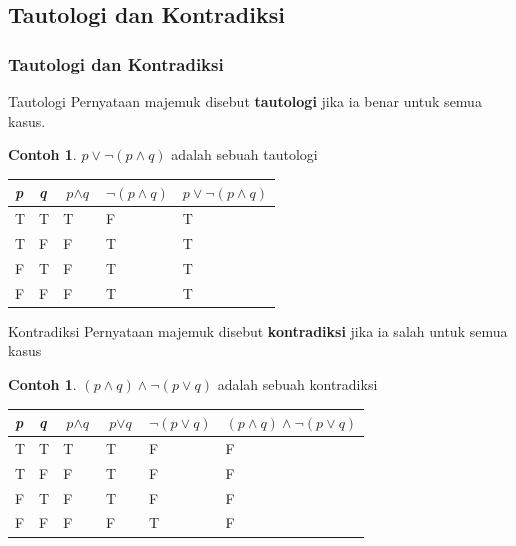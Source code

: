 \documentclass[handout]{beamer}
\theoremstyle{definition}
\theoremstyle{example}
\newtheorem{contoh}[theorem]{Contoh}
\begin{document}
\subsection{Tautologi dan Kontradiksi}
\begin{frame}[shrink]
	\frametitle{Tautologi dan Kontradiksi}

	\begin{block}{Tautologi}
    Pernyataan majemuk disebut \textbf{tautologi} jika ia benar untuk semua kasus.    
    \end{block}	
    \begin{contoh}
      $p \vee \neg(p \wedge q)$ adalah sebuah tautologi\\
      \begin{tabular}{ | l | l | l | l | l |}
      	\hline
      	\textit{p} & \textit{q} &  $\textit{p}\wedge\textit{q}$ & $\neg(\textit{p}\wedge\textit{q})$ & $p \vee \neg(p \wedge q)$ \\ \hline
      	T &  T & T & F & T\\ \hline
      	T &  F & F & T & T \\ \hline
      	F &  T & F & T & T\\ \hline
      	F &  F & F & T & T\\     		 
      	\hline
      \end{tabular}
    \end{contoh}
    \begin{block}{Kontradiksi}
    	Pernyataan majemuk disebut \textbf{kontradiksi} jika ia salah untuk semua kasus
    \end{block}
    \begin{contoh}
    $(p \wedge q)\wedge\neg(p \vee q)$ adalah sebuah kontradiksi\\
    \begin{tabular}{ | l | l | l | l | l | l |}
    	\hline
    	\textit{p} & \textit{q} &  $\textit{p}\wedge\textit{q}$ & 
    	$\textit{p}\vee\textit{q}$ &
    	$\neg(\textit{p}\vee\textit{q})$ & $(p \wedge q)\wedge\neg(p \vee q)$ \\ \hline
    	T &  T & T & T & F & F\\ \hline
    	T &  F & F & T & F & F \\ \hline
    	F &  T & F & T & F & F\\ \hline
    	F &  F & F & F & T & F\\     		 
    	\hline
    \end{tabular}	
    \end{contoh}
\end{frame}	
\end{document}
